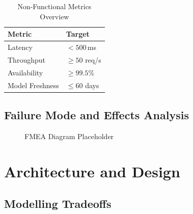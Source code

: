 \documentclass[12pt, a4paper]{report}
\begin{document}
\begin{table}[H]
    \centering
    \caption{Non-Functional Metrics Overview}
    \begin{tabular}{lp{4cm}}
        \toprule
        \textbf{Metric}     & \textbf{Target}          \\
        \midrule
        Latency             & $<500$\,ms               \\
        Throughput          & $\geq50$ req/s          \\
        Availability        & $\geq99.5\%$             \\
        Model Freshness     & $\leq60$ days            \\
        \bottomrule
    \end{tabular}
    \label{tab:nonfunctional-metrics}
\end{table}

\section{Failure Mode and Effects Analysis}

\lipsum[8][1-4]

\begin{figure}[H]
    \centering
    \fbox{\rule{0pt}{4cm}\rule{0.6\textwidth}{0pt}}
    \caption{FMEA Diagram Placeholder}
    \label{fig:fmea}
\end{figure}

\lipsum[9][1-2]

\chapter{Architecture and Design}

\lipsum[10][1-3]

\section{Modelling Tradeoffs}

\lipsum[11][1-4]

\end{document}

